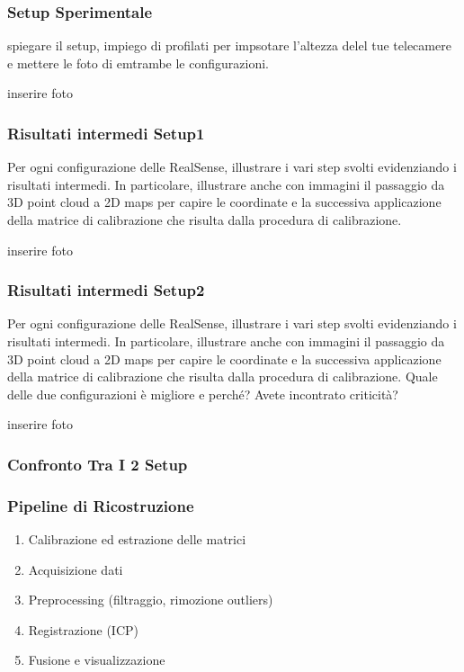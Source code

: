 \documentclass[aspectratio=169]{beamer}
\begin{document}
\begin{frame}
    \frametitle{Setup Sperimentale}

    spiegare il setup, impiego di profilati per impsotare l'altezza delel tue telecamere e mettere le foto di emtrambe le configurazioni.
    
    inserire foto 
\end{frame}

\begin{frame}
    \frametitle{Risultati intermedi Setup1}

    Per ogni configurazione delle RealSense, illustrare i vari step svolti evidenziando i risultati intermedi. In particolare, illustrare anche con immagini il passaggio da 3D point cloud a 2D maps per capire le coordinate e la successiva applicazione della matrice di calibrazione che risulta dalla procedura di calibrazione.
    
    inserire foto 

\end{frame}

\begin{frame}
    \frametitle{Risultati intermedi Setup2}

    Per ogni configurazione delle RealSense, illustrare i vari step svolti evidenziando i risultati intermedi. In particolare, illustrare anche con immagini il passaggio da 3D point cloud a 2D maps per capire le coordinate e la successiva applicazione della matrice di calibrazione che risulta dalla procedura di calibrazione. Quale delle due configurazioni è migliore e perché? Avete incontrato criticità? 
    
    inserire foto 

\end{frame}

\begin{frame}
    \frametitle{Confronto Tra I 2 Setup}

    
\end{frame}

\begin{frame}

    \frametitle{Pipeline di Ricostruzione}

    \begin{enumerate}

        \item Calibrazione ed estrazione delle matrici

        \item Acquisizione dati

        \item Preprocessing (filtraggio, rimozione outliers)

        \item Registrazione (ICP)

        \item Fusione e visualizzazione

    \end{enumerate}
\end{frame}
\end{document}
